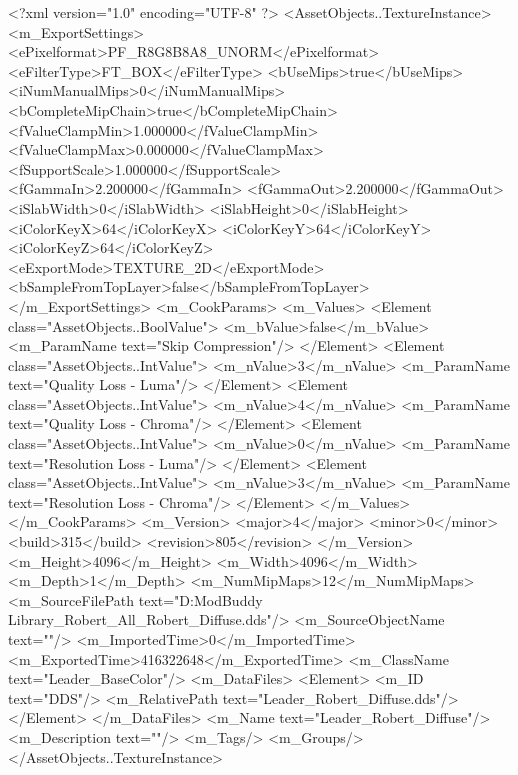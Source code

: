 <?xml version="1.0" encoding="UTF-8" ?>
<AssetObjects..TextureInstance>
	<m_ExportSettings>
		<ePixelformat>PF_R8G8B8A8_UNORM</ePixelformat>
		<eFilterType>FT_BOX</eFilterType>
		<bUseMips>true</bUseMips>
		<iNumManualMips>0</iNumManualMips>
		<bCompleteMipChain>true</bCompleteMipChain>
		<fValueClampMin>1.000000</fValueClampMin>
		<fValueClampMax>0.000000</fValueClampMax>
		<fSupportScale>1.000000</fSupportScale>
		<fGammaIn>2.200000</fGammaIn>
		<fGammaOut>2.200000</fGammaOut>
		<iSlabWidth>0</iSlabWidth>
		<iSlabHeight>0</iSlabHeight>
		<iColorKeyX>64</iColorKeyX>
		<iColorKeyY>64</iColorKeyY>
		<iColorKeyZ>64</iColorKeyZ>
		<eExportMode>TEXTURE_2D</eExportMode>
		<bSampleFromTopLayer>false</bSampleFromTopLayer>
	</m_ExportSettings>
	<m_CookParams>
		<m_Values>
			<Element class="AssetObjects..BoolValue">
				<m_bValue>false</m_bValue>
				<m_ParamName text="Skip Compression"/>
			</Element>
			<Element class="AssetObjects..IntValue">
				<m_nValue>3</m_nValue>
				<m_ParamName text="Quality Loss - Luma"/>
			</Element>
			<Element class="AssetObjects..IntValue">
				<m_nValue>4</m_nValue>
				<m_ParamName text="Quality Loss - Chroma"/>
			</Element>
			<Element class="AssetObjects..IntValue">
				<m_nValue>0</m_nValue>
				<m_ParamName text="Resolution Loss - Luma"/>
			</Element>
			<Element class="AssetObjects..IntValue">
				<m_nValue>3</m_nValue>
				<m_ParamName text="Resolution Loss - Chroma"/>
			</Element>
		</m_Values>
	</m_CookParams>
	<m_Version>
		<major>4</major>
		<minor>0</minor>
		<build>315</build>
		<revision>805</revision>
	</m_Version>
	<m_Height>4096</m_Height>
	<m_Width>4096</m_Width>
	<m_Depth>1</m_Depth>
	<m_NumMipMaps>12</m_NumMipMaps>
	<m_SourceFilePath text="D:\MyDocuments\Firaxis ModBuddy Library\RobertTywin\Leader_Robert\Unfold_All\Leader_Robert_Diffuse.dds"/>
	<m_SourceObjectName text=""/>
	<m_ImportedTime>0</m_ImportedTime>
	<m_ExportedTime>416322648</m_ExportedTime>
	<m_ClassName text="Leader_BaseColor"/>
	<m_DataFiles>
		<Element>
			<m_ID text="DDS"/>
			<m_RelativePath text="Leader_Robert_Diffuse.dds"/>
		</Element>
	</m_DataFiles>
	<m_Name text="Leader_Robert_Diffuse"/>
	<m_Description text=""/>
	<m_Tags/>
	<m_Groups/>
</AssetObjects..TextureInstance>

